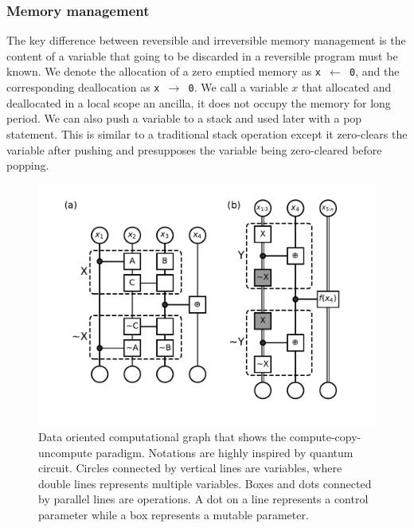 \documentclass[aps,twocolumn,longbibliography,english,superscriptaddress]{revtex4-1}
\newcommand{\<}{\langle}
\renewcommand{\>}{\rangle}
\theoremstyle{definition}\newtheorem{definition}{\textit{Definition}}
\begin{document}
\subsubsection{Memory management}
    The key difference between reversible and irreversible memory management is the content of a variable that going to be discarded in a reversible program must be known.
    We denote the allocation of a zero emptied memory as \texttt{x $\leftarrow$ 0}, and the corresponding deallocation as \texttt{x $\rightarrow$ 0}.
    We call a variable $x$ that allocated and deallocated in a local scope an ancilla, it does not occupy the memory for long period.
    We can also push a variable to a stack and used later with a pop statement. This is similar to a traditional stack operation except it zero-clears the variable after pushing and presupposes the variable being zero-cleared before popping.
\begin{figure}
    \centerline{\includegraphics[width=\columnwidth,trim={0 1cm 0 0cm},clip]{images/fig6.pdf}}
    \caption{Data oriented computational graph that shows the compute-copy-uncompute paradigm. Notations are highly inspired by quantum circuit. Circles connected by vertical lines are variables, where double lines represents multiple variables. Boxes and dots connected by parallel lines are operations. A dot on a line represents a control parameter while a box represents a mutable parameter.
    }\label{fig:ccu}
\end{figure}
\end{document}
